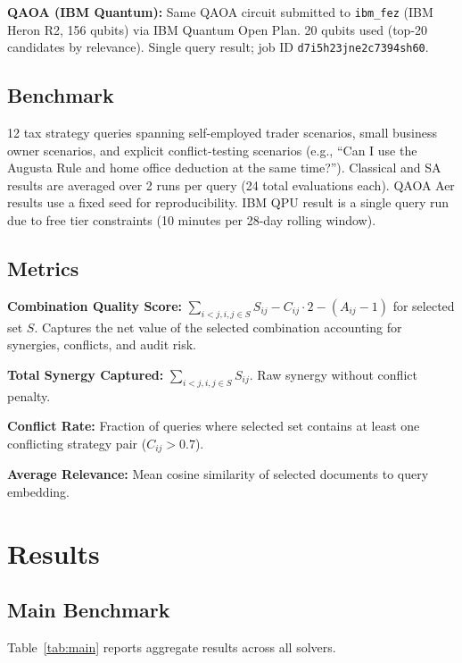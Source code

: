 \documentclass{article}
\begin{document}
\textbf{QAOA (IBM Quantum):} Same QAOA circuit submitted to
\texttt{ibm\_fez} (IBM Heron R2, 156 qubits) via IBM Quantum Open Plan.
20 qubits used (top-20 candidates by relevance). Single query result;
job ID \texttt{d7i5h23jne2c7394sh60}.

\subsection{Benchmark}

12 tax strategy queries spanning self-employed trader scenarios,
small business owner scenarios, and explicit conflict-testing scenarios
(e.g., ``Can I use the Augusta Rule and home office deduction at the
same time?''). Classical and SA results are averaged over 2 runs per
query (24 total evaluations each). QAOA Aer results use a fixed seed
for reproducibility. IBM QPU result is a single query run due to free
tier constraints (10 minutes per 28-day rolling window).

\subsection{Metrics}

\textbf{Combination Quality Score:} $\sum_{i<j, i,j \in S} S_{ij} -
C_{ij} \cdot 2 - (A_{ij} - 1)$ for selected set $S$. Captures the
net value of the selected combination accounting for synergies,
conflicts, and audit risk.

\textbf{Total Synergy Captured:} $\sum_{i<j, i,j \in S} S_{ij}$.
Raw synergy without conflict penalty.

\textbf{Conflict Rate:} Fraction of queries where selected set contains
at least one conflicting strategy pair ($C_{ij} > 0.7$).

\textbf{Average Relevance:} Mean cosine similarity of selected
documents to query embedding.

\section{Results}
\label{sec:results}

\subsection{Main Benchmark}

Table~\ref{tab:main} reports aggregate results across all solvers.
\end{document}
